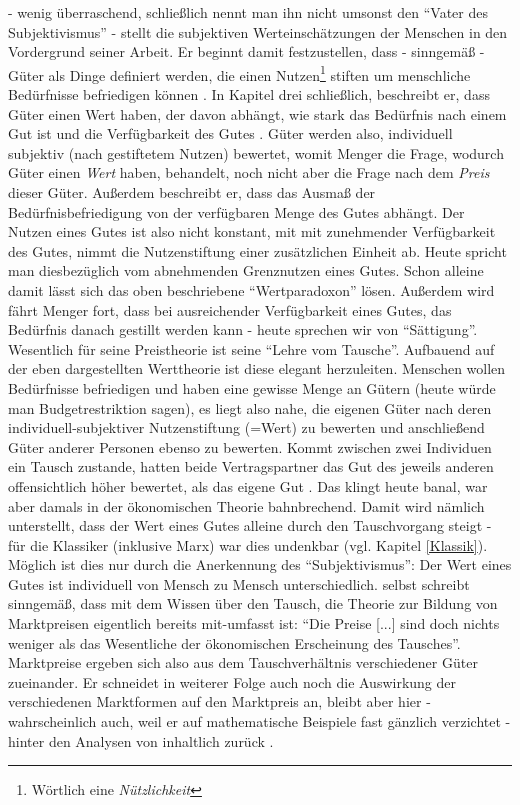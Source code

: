 \textcite{Menger1871} - wenig überraschend, schließlich nennt man ihn nicht umsonst den "`Vater des Subjektivismus"' - stellt die subjektiven Werteinschätzungen der Menschen in den Vordergrund seiner Arbeit. Er beginnt damit festzustellen, dass - sinngemäß -  Güter als Dinge definiert werden, die einen Nutzen\footnote{Wörtlich eine \textit{Nützlichkeit}} stiften um menschliche Bedürfnisse befriedigen können \parencite[S. 1f]{Menger1871}. In Kapitel drei schließlich, beschreibt er, dass Güter einen Wert haben, der davon abhängt, wie stark das Bedürfnis nach einem Gut ist und die Verfügbarkeit des Gutes \parencite[S. 78]{Menger1871}. Güter werden also, individuell subjektiv (nach gestiftetem Nutzen) bewertet, womit Menger die Frage, wodurch Güter einen \textit{Wert} haben, behandelt, noch nicht aber die Frage nach dem \textit{Preis} dieser Güter. Außerdem beschreibt er, dass das Ausmaß der Bedürfnisbefriedigung von der verfügbaren Menge des Gutes abhängt. Der Nutzen eines Gutes ist also nicht konstant, mit mit zunehmender Verfügbarkeit des Gutes, nimmt die Nutzenstiftung einer zusätzlichen Einheit ab. Heute spricht man diesbezüglich vom abnehmenden Grenznutzen eines Gutes. Schon alleine damit lässt sich das oben beschriebene "`Wertparadoxon"' lösen. Außerdem wird fährt Menger fort, dass bei ausreichender Verfügbarkeit eines Gutes, das Bedürfnis danach gestillt werden kann - heute sprechen wir von "`Sättigung"'. 
Wesentlich für seine Preistheorie ist seine "`Lehre vom Tausche"'. Aufbauend auf der eben dargestellten Werttheorie ist diese elegant herzuleiten. Menschen wollen Bedürfnisse befriedigen und haben eine gewisse Menge an Gütern (heute würde man Budgetrestriktion sagen), es liegt also nahe, die eigenen Güter nach deren individuell-subjektiver Nutzenstiftung (=Wert) zu bewerten und anschließend Güter anderer Personen ebenso zu bewerten. Kommt zwischen zwei Individuen ein Tausch zustande, hatten beide Vertragspartner das Gut des jeweils anderen offensichtlich höher bewertet, als das eigene Gut \parencite[S. 156]{Menger1871}. Das klingt heute banal, war aber damals in der ökonomischen Theorie bahnbrechend. Damit wird nämlich unterstellt, dass der Wert eines Gutes alleine durch den Tauschvorgang steigt - für die Klassiker (inklusive Marx) war dies undenkbar (vgl. Kapitel \ref{Klassik}). Möglich ist dies nur durch die Anerkennung des "`Subjektivismus"': Der Wert eines Gutes ist individuell von Mensch zu Mensch unterschiedlich.
\textcite[S. 172]{Menger1871} selbst schreibt sinngemäß, dass mit dem Wissen über den Tausch, die Theorie zur Bildung von Marktpreisen eigentlich bereits mit-umfasst ist: "`Die Preise [...] sind doch nichts weniger als das Wesentliche der ökonomischen Erscheinung des Tausches"'. Marktpreise ergeben sich also aus dem Tauschverhältnis verschiedener Güter zueinander. Er schneidet in weiterer Folge auch noch die Auswirkung der verschiedenen Marktformen auf den Marktpreis an, bleibt aber hier - wahrscheinlich auch, weil er auf mathematische Beispiele fast gänzlich verzichtet - hinter den Analysen von \textcite{Cournot1838} inhaltlich zurück \parencite[S. 304]{Rosner2012}.

